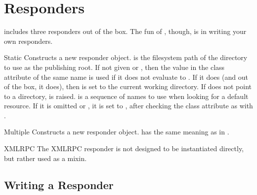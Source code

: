 \section{Responders \label{responders}}

 includes three responders out of the box. The fun of
, though, is in writing your own responders.

\begin{classdesc}{Static}{} Constructs a new
 responder object.  is the filesystem path of the
directory to use as the publishing root. If not given or , then the
value in the class attribute of the same name is used if it does not evaluate to
. If it does (and out of the box, it does), then  is set
to the current working directory. If  does not point to a directory,
 is raised.  is a sequence of names to use
when looking for a default resource. If it is omitted or , it is set
to , after checking the class attribute as
with . \end{classdesc}

\begin{classdesc}{Multiple}{} Constructs a new 
responder object.  has the same meaning as in
.\end{classdesc}

\begin{classdesc*}{XMLRPC}
The XMLRPC responder is not designed to be instantiated directly, but rather
used as a mixin.
\end{classdesc*}







\subsection{Writing a Responder \label{writing-a-responder}}
